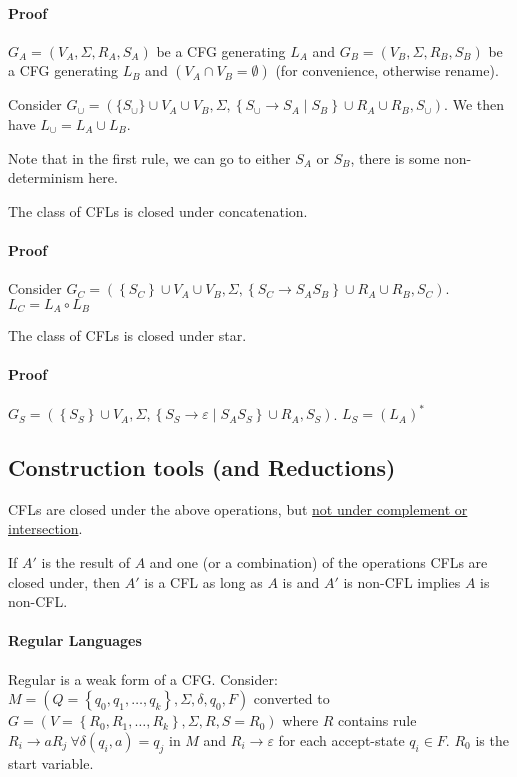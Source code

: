 \documentclass[12 pt]{article}
\begin{document}
\paragraph{Proof}
$G_A = (V_A, \Sigma, R_A, S_A)$ be a CFG generating $L_A$ and
$G_B = (V_B, \Sigma, R_B, S_B)$ be a CFG generating $L_B$ and $(V_A
\cap V_B = \emptyset)$ (for convenience, otherwise rename).

Consider $G_\cup = (\{S_\cup\}\cup V_A \cup V_B, \Sigma, \left\{S_\cup
\to S_A \mid S_B\right\} \cup R_A \cup R_B, S_\cup)$. We then have
$L_\cup = L_A \cup L_B$.

Note that in the first rule, we can go to either $S_A$ or $S_B$, there
is some non-determinism here.

The class of CFLs is closed under concatenation.
\paragraph{Proof}
Consider $G_C = ( \left\{S_C\right\}\cup V_A \cup V_B, \Sigma,
\left\{S_C \to S_AS_B\right\}\cup R_A \cup R_B, S_C)$. $L_C = L_A
\circ L_B$

The class of CFLs is closed under star.
\paragraph{Proof}
$G_S = ( \left\{S_S\right\}\cup V_A, \Sigma, \left\{S_S \to
  \varepsilon \mid S_A S_S\right\} \cup R_A, S_S)$. $L_S = (L_A)^*$
\subsection{Construction tools (and Reductions)}
CFLs are closed under the above operations, but \underline{not under
  complement or intersection}.

If $A'$ is the result of $A$ and one (or a combination) of the operations CFLs are closed
under, then $A'$ is a CFL as long as $A$ is and $A'$ is non-CFL
implies $A$ is non-CFL.

\paragraph{Regular Languages}
Regular is a weak form of a CFG. Consider: $M = (Q= \left\{q_0, q_1,
  \ldots, q_k\right\}, \Sigma, \delta, q_0, F)$ converted to $G = (V =
\left\{R_0,R_1, \ldots, R_k\right\}, \Sigma, R, S=R_0)$ where $R$
contains rule $R_i \to aR_j\ \forall \delta(q_i,a) = q_j$ in $M$ and
$R_i \to \varepsilon$ for each accept-state $q_i \in F$. $R_0$ is
the start variable.
\end{document}
